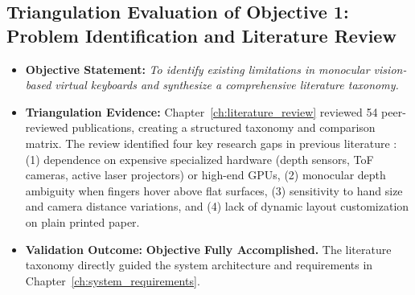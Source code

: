 \subsection{Triangulation Evaluation of Objective 1: Problem Identification and Literature Review}
\label{subsec:concl_obj1}
\begin{itemize}
    \item \textbf{Objective Statement:} \emph{To identify existing limitations in monocular vision-based virtual keyboards and synthesize a comprehensive literature taxonomy.}
    \item \textbf{Triangulation Evidence:} Chapter~\ref{ch:literature_review} reviewed 54 peer-reviewed publications, creating a structured taxonomy and comparison matrix. The review identified four key research gaps in previous literature \cite{ReviewVirtualKeyboard2020, Ji2018Local, Posner2012Single}: (1) dependence on expensive specialized hardware (depth sensors, ToF cameras, active laser projectors) or high-end GPUs, (2) monocular depth ambiguity when fingers hover above flat surfaces, (3) sensitivity to hand size and camera distance variations, and (4) lack of dynamic layout customization on plain printed paper.
    \item \textbf{Validation Outcome:} \textbf{Objective Fully Accomplished.} The literature taxonomy directly guided the system architecture and requirements in Chapter~\ref{ch:system_requirements}.
\end{itemize}

